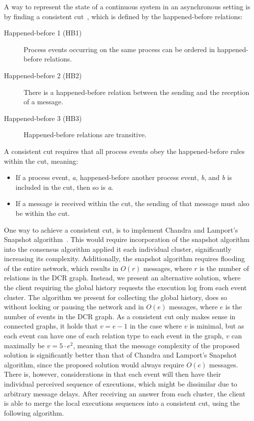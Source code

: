 \documentclass{article}
\begin{document}
	A way to represent the state of a continuous system in an asynchronous setting is by finding a consistent cut~\cite{lamport_time_1978}, which is defined by the happened-before relations:

	\begin{description}
		\item[Happened-before 1 (HB1)] Process events occurring on the same process can be ordered in happened-before relations.
		\item[Happened-before 2 (HB2)] There is a happened-before relation between the sending and the reception of a message.
		\item[Happened-before 3 (HB3)] Happened-before relations are transitive.
	\end{description}

	A consistent cut requires that all process events obey the happened-before rules within the cut, meaning:
	\begin{itemize}
		\item If a process event, \textit{a}, happened-before another process event, \textit{b}, and \textit{b} is included in the cut, then so is \textit{a}.
		\item If a message is received within the cut, the sending of that message must also be within the cut.
	\end{itemize}

	One way to achieve a consistent cut, is to implement Chandra and Lamport's Snapshot algorithm~\cite{chandy_distributed_1985}.
	This would require incorporation of the snapshot algorithm into the consensus algorithm applied it each individual cluster, significantly increasing its complexity.
	Additionally, the snapshot algorithm requires flooding of the entire network, which results in $O(r)$  messages, where $r$ is the number of relations in the DCR graph.
	Instead, we present an alternative solution, where the client requiring the global history requests the execution log from each event cluster.
	The algorithm we present for collecting the global history, does so without locking or pausing the network and in $O(e)$ messages, where $e$ is the number of events in the DCR graph.
	As a consistent cut only makes sense in connected graphs, it holds that $v = e-1$ in the case where $v$ is minimal, but as each event can have one of each relation type to each event in the graph, $v$ can maximally be $v = 5\cdot e^2$, meaning that the message complexity of the proposed solution is significantly better than that of Chandra and Lamport's Snapshot algorithm, since the proposed solution would always require $O(e)$ messages.
	There is, however, considerations in that each event will then have their individual perceived sequence of executions, which might be dissimilar due to arbitrary message delays.
	After receiving an answer from each cluster, the client is able to merge the local executions sequences into a consistent cut, using the following algorithm.
\end{document}
